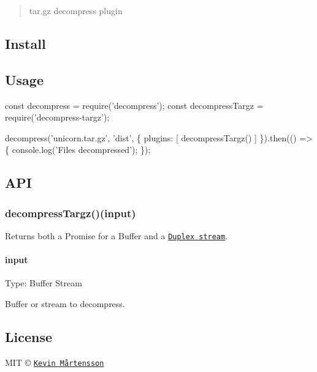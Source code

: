 \begin{quote}
tar.\+gz decompress plugin \end{quote}


\subsection*{Install}




\subsection*{Usage}


\begin{DoxyCode}
const decompress = require('decompress');
const decompressTargz = require('decompress-targz');

decompress('unicorn.tar.gz', 'dist', \{
  plugins: [
    decompressTargz()
  ]
\}).then(() => \{
  console.log('Files decompressed');
\});
\end{DoxyCode}


\subsection*{A\+PI}

\subsubsection*{decompress\+Targz()(input)}

Returns both a Promise for a Buffer and a \href{https://nodejs.org/api/stream.html#stream_class_stream_duplex}{\tt Duplex stream}.

\paragraph*{input}

Type\+: {\ttfamily Buffer} {\ttfamily Stream}

Buffer or stream to decompress.

\subsection*{License}

M\+IT © \href{https://github.com/kevva}{\tt Kevin Mårtensson} 